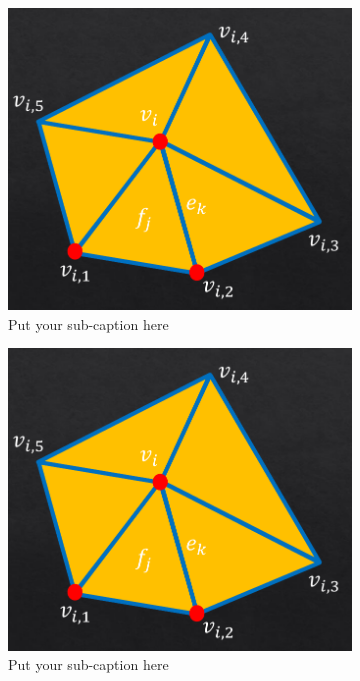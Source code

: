 \documentclass[12pt]{article} %
\begin{document}
\begin{figure}[!htb]
  \begin{subfigure}{.49\textwidth}
    \centering
    \includegraphics[width=.8\linewidth]{mesh.png}  
    \caption{Put your sub-caption here}
    \label{fig:sub-first}
  \end{subfigure}
  \begin{subfigure}{.49\textwidth}
    \centering
    \includegraphics[width=.8\linewidth]{mesh.png}  
    \caption{Put your sub-caption here}
    \label{fig:sub-second}
  \end{subfigure}
  \newline
  \begin{subfigure}{.49\textwidth}
    \centering

\end{subfigure}
\end{figure}
\end{document}
